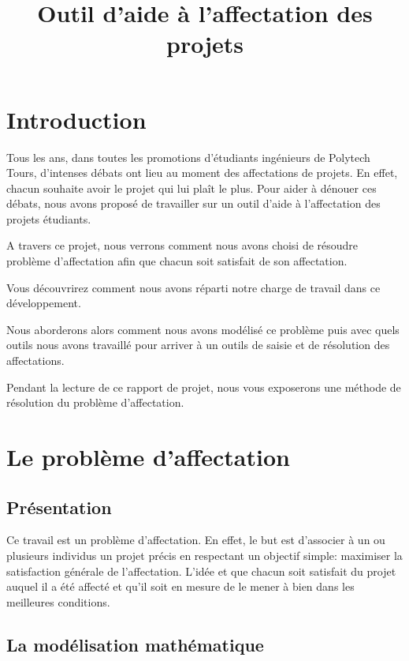 \documentclass{polytech/polytech}
\title{Outil d'aide à l'affectation des projets}
\begin{document}

\chapter*{Introduction}
\label{chap:intro}

Tous les ans, dans toutes les promotions d'étudiants ingénieurs de Polytech Tours, d'intenses débats ont lieu au moment des affectations de projets. En effet, chacun souhaite avoir le projet qui lui plaît le plus. Pour aider à dénouer ces débats, nous avons proposé de travailler sur un outil d'aide à l'affectation des projets étudiants. 

A travers ce projet, nous verrons comment nous avons choisi de résoudre problème d'affectation afin que chacun soit satisfait de son affectation.

Vous découvrirez comment nous avons réparti notre charge de travail dans ce développement.

Nous aborderons alors comment nous avons modélisé ce problème puis avec quels outils nous avons travaillé pour arriver à un outils de saisie et de résolution des affectations.

Pendant la lecture de ce rapport de projet, nous vous exposerons une méthode de résolution du problème d'affectation.

\chapter{Le problème d'affectation}
\label{chap:pb_affectation}

\section{Présentation}
\label{sec:pres_affectation}

Ce travail est un problème d'affectation.
En effet, le but est d'associer à un ou plusieurs individus un projet précis en respectant un objectif simple: maximiser la satisfaction générale de l'affectation.
L'idée et que chacun soit satisfait du projet auquel il a été affecté et qu'il soit en mesure de le mener à bien dans les meilleures conditions.


\section{La modélisation mathématique}
\label{sec:mod_math}
\end{document}
